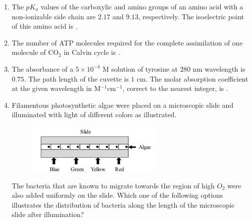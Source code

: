 \documentclass[journal,12pt,onecolumn]{IEEEtran}
\theoremstyle{remark}
\begin{document}
\begin{enumerate}
    \hfill{}

    \item The $pK_a$ values of the carboxylic and amino groups of an amino acid with a non-ionizable side chain are $2.17$ and $9.13$, respectively. The isoelectric point  of this amino acid is \underline{\hspace{2cm}}.

    \hfill{}

    \item The number of ATP molecules required for the complete assimilation of one molecule of CO$_2$ in Calvin cycle is \underline{\hspace{2cm}}.

    \hfill{}

    \item The absorbance of a $5 \times 10^{-4}$ M solution of tyrosine at $280$ nm wavelength is $0.75$. The path length of the cuvette is $1$ cm. The molar absorption coefficient at the given wavelength in M$^{-1}$cm$^{-1}$, correct to the nearest integer, is \underline{\hspace{2cm}}.

    \hfill{}

    \item Filamentous photosynthetic algae were placed on a microscopic slide and illuminated with light of different colors as illustrated.
    \begin{figure}[h!]
        \centering
        \includegraphics[width=0.6\columnwidth]{fig18.png}
        \caption*{}
        \label{fig:q36}
    \end{figure}
    The bacteria that are known to migrate towards the region of high $O_2$ were also added uniformly on the slide. Which one of the following options illustrates the distribution of bacteria along the length of the microscopic slide after illumination?


\end{enumerate}
\end{document}
